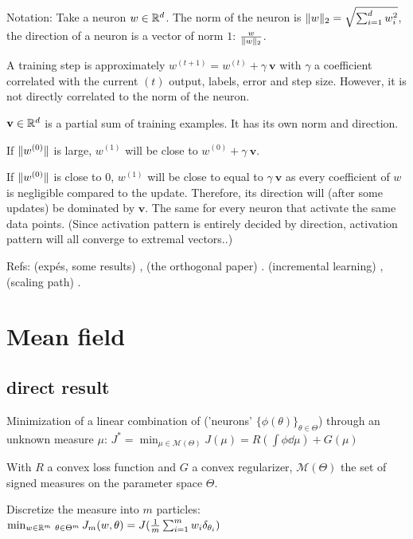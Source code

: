 Notation: Take a neuron $w \in \mathbb{R}^d$. The norm of the neuron is $\lVert w\rVert_2 = \sqrt{\sum_{i=1}^{d} w_i^2}$, the direction of a neuron is a vector of norm $1$: $\frac{w}{\lVert w\rVert_2}$.

A training step is approximately $w^{(t+1)} = w^{(t)} + \gamma ~ \mathbf{v}$ with $\gamma$ a coefficient correlated with the current $(t)$ output, labels, error and step size. However, it is not directly correlated to the norm of the neuron.

$\mathbf{v} \in \mathbb{R}^d$ is a partial sum of training examples. It has its own norm and direction.

If $\lVert w^{(0)}\rVert$ is large, $w^{(1)}$ will be close to $w^{(0)} + \gamma ~ \mathbf{v}$.

If $\lVert w^{(0)}\rVert$ is close to 0, $w^{(1)}$ will be close to equal to $\gamma ~ \mathbf{v}$ as every coefficient of $w$ is negligible compared to the update. Therefore, its direction will (after some updates) be dominated by $\mathbf{v}$. The same for every neuron that activate the same data points. (Since activation pattern is entirely decided by direction, activation pattern will all converge to extremal vectors..)

Refs: (expés, some results) \citep{maennel2018gradient}, (the orthogonal paper) \citep{boursierGradientFlowDynamics2022}. (incremental learning) \citep{berthierIncrementalLearningDiagonal}, (scaling path) \citep{neumayerEffectInitializationScaling2023}.

\section{Mean field}



\subsection{direct result}

Minimization of a linear combination of ('neurons' $\{\phi(\theta)\}_{\theta \in \Theta}$) through an unknown measure $\mu$: $J^* = \min_{\mu \in \mathcal{M}(\Theta)} J(\mu) = R(\int \phi \dd \mu) + G(\mu)$

With $R$ a convex loss function and $G$ a convex regularizer, $\mathcal{M}(\Theta)$ the set of signed measures on the parameter space $\Theta$.

Discretize the measure into $m$ particles: $\min_{w \in \mathbb{R}^m \\\ \theta \in \Theta^m} J_m(w, \theta) = J( \frac{1}{m} \sum_{i=1}^{m} w_i \delta_{\theta_i})$

